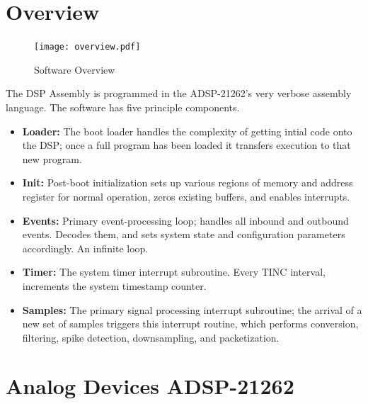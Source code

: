 
\section{Overview}

\begin{figure}[h!]
\begin{center}
\texttt{[image: overview.pdf]}
\end{center}
\caption{Software Overview}
\label{overview}
\end{figure}

The DSP Assembly is programmed in the ADSP-21262's very verbose assembly language. The software has five principle components.

\begin{itemize}
\item \textbf{Loader:} The boot loader handles the complexity of getting intial code onto the DSP; once a full program has been loaded it transfers execution to that new program. 

\item \textbf{Init:} Post-boot initialization sets up various regions of memory and address register for normal operation, zeros existing buffers, and enables interrupts. 

\item \textbf{Events:} Primary event-processing loop; handles all inbound and outbound events. Decodes them, and sets system state and configuration parameters accordingly. An infinite loop. 

\item \textbf{Timer:} The system timer interrupt subroutine. Every TINC interval, increments the system timestamp counter. 

\item \textbf{Samples:} The primary signal processing interrupt subroutine; the arrival of a new set of samples triggers this interrupt routine, which performs conversion, filtering, spike detection, downsampling, and packetization. 

\end{itemize}

\section{Analog Devices ADSP-21262}

